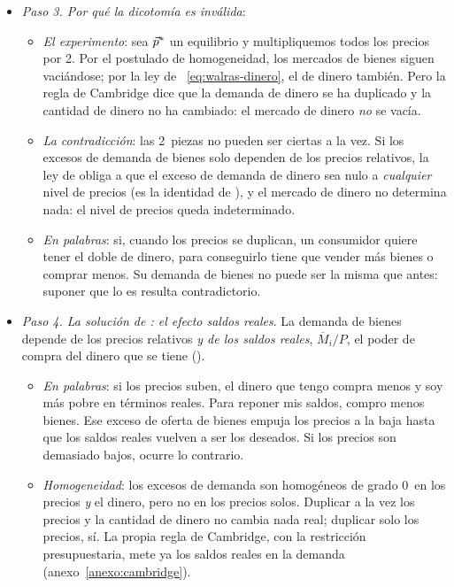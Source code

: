 \documentclass[11pt]{article}
\begin{document}
\begin{itemize}
\begin{itemize}
\begin{equation}
    \end{equation}
  \item \emph{El reparto de papeles}: el sector real fijaría los precios relativos y el mercado de dinero, con $M^D(\vect{p})=\overline{M}$, el nivel de precios.
  \end{itemize}
\item \emph{Paso 3. Por qué la dicotomía es inválida}\nocite{Lange1942Say,Patinkin1965Money}:
  \begin{itemize}
  \item \emph{El experimento}: sea $\vec{p}^*$ un equilibrio y multipliquemos todos los precios por 2. Por el postulado de homogeneidad, los mercados de bienes siguen vaciándose; por la ley de ~\eqref{eq:walras-dinero}, el de dinero también. Pero la regla de Cambridge dice que la demanda de dinero se ha duplicado y la cantidad de dinero no ha cambiado: el mercado de dinero \emph{no} se vacía.
  \item \emph{La contradicción}: las 2~piezas no pueden ser ciertas a la vez. Si los excesos de demanda de bienes solo dependen de los precios relativos, la ley de  obliga a que el exceso de demanda de dinero sea nulo a \emph{cualquier} nivel de precios (es la identidad de ), y el mercado de dinero no determina nada: el nivel de precios queda indeterminado.
  \item \emph{En palabras}: si, cuando los precios se duplican, un consumidor quiere tener el doble de dinero, para conseguirlo tiene que vender más bienes o comprar menos. Su demanda de bienes no puede ser la misma que antes: suponer que lo es resulta contradictorio.
  \end{itemize}
\item \emph{Paso 4. La solución de \textcite{Patinkin1956Money}: el efecto saldos reales}. La demanda de bienes depende de los precios relativos \emph{y de los saldos reales}, $\overline{M}_i/P$, el poder de compra del dinero que se tiene ().
  \begin{itemize}
  \item \emph{En palabras}: si los precios suben, el dinero que tengo compra menos y soy más pobre en términos reales. Para reponer mis saldos, compro menos bienes. Ese exceso de oferta de bienes empuja los precios a la baja hasta que los saldos reales vuelven a ser los deseados. Si los precios son demasiado bajos, ocurre lo contrario.
  \item \emph{Homogeneidad}: los excesos de demanda son homogéneos de grado 0~en los precios \emph{y} el dinero, pero no en los precios solos. Duplicar a la vez los precios y la cantidad de dinero no cambia nada real; duplicar solo los precios, sí. La propia regla de Cambridge, con la restricción presupuestaria, mete ya los saldos reales en la demanda (anexo~\ref{anexo:cambridge}).
  \end{itemize}
\end{itemize}
\end{document}
